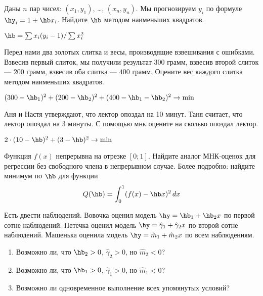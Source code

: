 \documentclass[pdftex,11pt,openany]{book}\usepackage[]{graphicx}\usepackage[]{color}
\begin{document}
\begin{problem}
Даны $n$ пар чисел: $(x_1, y_1)$, \ldots, $(x_n,y_n)$. Мы прогнозируем $y_i$ по формуле $\hy_i=1+\hb x_i$. Найдите $\hb$ методом наименьших квадратов. 
\end{problem}
\begin{solution}
$\hb=\sum x_i (y_i-1)/\sum x_i^2$
\end{solution}

\begin{problem}
 Перед нами два золотых слитка и весы, производящие взвешивания с ошибками. Взвесив первый слиток, мы получили результат $300$ грамм, взвесив второй слиток --- $200$ грамм, взвесив оба слитка --- $400$ грамм. Оцените вес каждого слитка методом наименьших квадратов.
 \end{problem}
\begin{solution}
 $(300-\hb_1)^2+(200-\hb_2)^2+(400-\hb_1-\hb_2)^2\to\min$ 
\end{solution}


\begin{problem}
 Аня и Настя утверждают, что лектор опоздал на 10 минут. Таня считает, что лектор опоздал на 3 минуты. С помощью мнк оцените на сколько опоздал лектор. 
\end{problem}
\begin{solution}
 $2\cdot (10-\hb)^2+(3-\hb)^2\to\min$ 
\end{solution}


\begin{problem}
 Функция $f(x)$ непрерывна на отрезке $[0;1]$. Найдите аналог МНК-оценок для регрессии без свободного члена в непрерывном случае. Более подробно: найдите минимум по $\hb$ для функции
\begin{equation}
Q(\hb)= \int_0^1 (f(x)-\hb x)^2\,dx
\end{equation}
\end{problem}

\begin{solution}
\end{solution}


\begin{problem}
 Есть двести наблюдений. Вовочка оценил модель $\hy=\hb_1+\hb_2 x$ по первой сотне наблюдений. Петечка оценил модель $\hy=\hat{\gamma}_1+\hat{\gamma}_2 x$ по второй сотне наблюдений. Машенька оценила модель $\hy=\hat{m}_1+\hat{m}_2 x$ по всем наблюдениям.
\begin{enumerate}
\item Возможно ли, что $\hb_2>0$, $\hat{\gamma}_2>0$, но $\hat{m}_2<0$?
\item Возможно ли, что $\hb_1>0$, $\hat{\gamma}_1>0$, но $\hat{m}_1<0$?
\item Возможно ли одновременное выполнение всех упомянутых условий?
\end{enumerate}
\end{problem}
\end{document}
